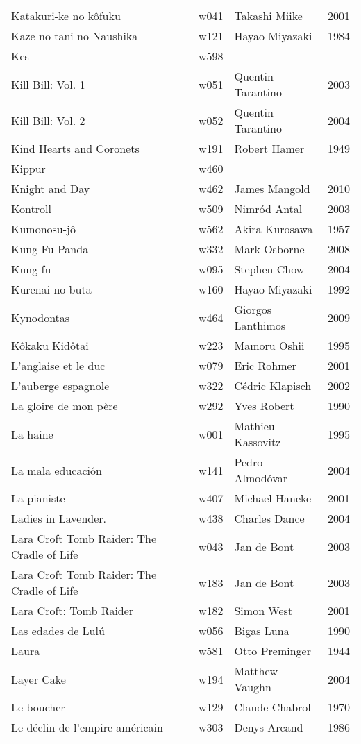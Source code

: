 \documentclass{article}
\begin{document}
\begin {center}
\begin{longtable}{p{10cm} l l l}
Katakuri-ke no kôfuku & w041 & Takashi Miike & 2001 \\
Kaze no tani no Naushika & w121 & Hayao Miyazaki & 1984 \\
Kes & w598 &  &  \\
Kill Bill: Vol. 1 & w051 & Quentin Tarantino & 2003 \\
Kill Bill: Vol. 2 & w052 & Quentin Tarantino & 2004 \\
Kind Hearts and Coronets & w191 & Robert Hamer & 1949 \\
Kippur & w460 &  &  \\
Knight and Day & w462 & James Mangold & 2010 \\
Kontroll & w509 & Nimród Antal & 2003 \\
Kumonosu-jô & w562 & Akira Kurosawa & 1957 \\
Kung Fu Panda & w332 & Mark Osborne & 2008 \\
Kung fu & w095 & Stephen Chow & 2004 \\
Kurenai no buta & w160 & Hayao Miyazaki & 1992 \\
Kynodontas & w464 & Giorgos Lanthimos & 2009 \\
Kôkaku Kidôtai & w223 & Mamoru Oshii & 1995 \\
L'anglaise et le duc & w079 & Eric Rohmer & 2001 \\
L'auberge espagnole & w322 & Cédric Klapisch & 2002 \\
La gloire de mon père & w292 & Yves Robert & 1990 \\
La haine & w001 & Mathieu Kassovitz & 1995 \\
La mala educación & w141 & Pedro Almodóvar & 2004 \\
La pianiste & w407 & Michael Haneke & 2001 \\
Ladies in Lavender. & w438 & Charles Dance & 2004 \\
Lara Croft Tomb Raider: The Cradle of Life & w043 & Jan de Bont & 2003 \\
Lara Croft Tomb Raider: The Cradle of Life & w183 & Jan de Bont & 2003 \\
Lara Croft: Tomb Raider & w182 & Simon West & 2001 \\
Las edades de Lulú & w056 & Bigas Luna & 1990 \\
Laura & w581 & Otto Preminger & 1944 \\
Layer Cake & w194 & Matthew Vaughn & 2004 \\
Le boucher & w129 & Claude Chabrol & 1970 \\
Le déclin de l'empire américain & w303 & Denys Arcand & 1986 \\

\end{longtable}
\end{center}
\end{document}
